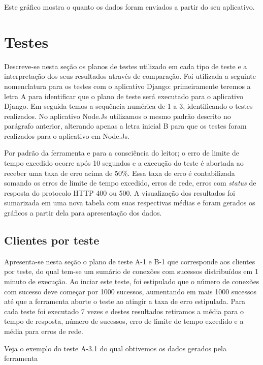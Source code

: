   Este gráfico mostra o quanto os dados foram enviados a partir do seu aplicativo.


\section{Testes}

  Descreve-se nesta seção os planos de testes utilizado em cada tipo de teste e a interpretação dos seus resultados
  através de comparação.
  Foi utilizada a seguinte nomenclatura para os testes com o aplicativo Django: primeiramente teremos a letra A para identificar
  que o plano de teste será executado para o aplicativo Django. Em seguida temos a sequência numérica de 1 a 3, 
  identificando o testes realizados. 
  No aplicativo Node.Js utilizamos o mesmo padrão descrito no parágrafo anterior, alterando apenas a letra inicial B para que os testes
  foram realizados para o aplicativo em Node.Js.
  
  Por padrão da ferramenta e para a consciência do leitor; o erro de limite de tempo excedido ocorre após 10 segundos e a execução do teste é abortada
  ao receber uma taxa de erro acima de 50\%. Essa taxa de erro é contabilizada somando os erros de limite de tempo excedido, erros de 
  rede, erros com \textit{status} de resposta do protocolo \ac{HTTP} 400 ou 500.
  A visualização dos resultados foi sumarizada em uma nova tabela com suas respectivas médias e foram gerados os gráficos a partir dela para apresentação dos
  dados.
  
\subsection{Clientes por teste}  

  
  Apresenta-se nesta seção o plano de teste A-1 e B-1 que corresponde aos clientes por teste,  do qual tem-se um sumário
  de conexões com sucessos distribuídos em 1 minuto de execução. 
  Ao inciar este teste, foi estipulado que o número de conexões com sucesso deve começar por 1000 sucessos, aumentando
  em mais 1000 sucessos até que a ferramenta aborte o teste ao atingir a taxa de erro estipulada. Para cada teste
  foi executado 7 vezes e destes resultados retiramos a média para o tempo de resposta, número de sucessos, erro de limite de tempo excedido 
  e a média para erros de rede.
  
  Veja o exemplo do teste A-3.1 do qual obtivemos os dados gerados pela ferramenta
  
